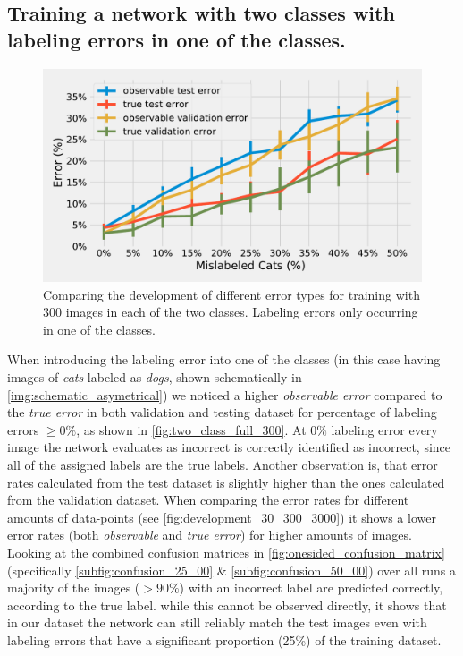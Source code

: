 \documentclass[a4paper,11pt]{scrartcl}
\theoremstyle{definition}
\begin{document}
\subsection[Two labels, labeling errors in one class]{Training a network with two classes with labeling errors in one of the classes.}
\begin{figure}[!h]
\centering
\includegraphics[width=.8\textwidth]{Plots_1/0300_full_comparison_noTitle.pdf}%
\caption[Error rates for training with two classes]{Comparing the development of different error types for training with 300 images in each of the two classes. Labeling errors only occurring in one of the classes.}
\label{fig:two_class_full_300}
\end{figure}
When introducing the labeling error into one of the classes (in this case having images of \emph{cats} labeled as \emph{dogs}, shown schematically in \ref{img:schematic_asymetrical}) we noticed a higher \emph{observable error} compared to the \emph{true error} in both validation and testing dataset for percentage of labeling errors $\geq0\%$, as shown in \autoref{fig:two_class_full_300}.
At $0\%$ labeling error every image the network evaluates as incorrect is correctly identified as incorrect, since all of the assigned labels are the true labels.
Another observation is, that error rates calculated from the test dataset is slightly higher than the ones calculated from the validation dataset.
When comparing the error rates for different amounts of data-points (see \autoref{fig:development_30_300_3000}) it shows a lower error rates (both \emph{observable} and \emph{true error}) for higher amounts of images.
Looking at the combined confusion matrices in \autoref{fig:onesided_confusion_matrix} (specifically \ref{subfig:confusion_25_00} \& \ref{subfig:confusion_50_00}) over all runs a majority of the images ($>90\%$) with an incorrect label are predicted correctly, according to the true label.
while this cannot be observed directly, it shows that in our dataset the network can still reliably match the test images even with labeling errors that have a significant proportion (25\%) of the training dataset.
\end{document}
